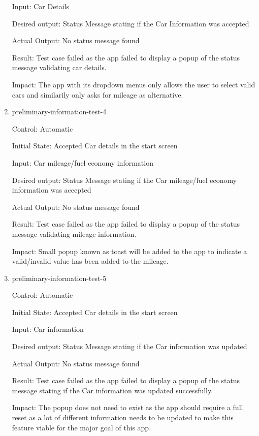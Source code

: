 \documentclass[12pt, titlepage]{article}
\begin{document}
\begin{enumerate}
Input: Car Details

Desired output: Status Message stating if the Car Information was accepted

Actual Output: No status message found

Result: Test case failed as the app failed to display a popup of the status message validating car details.

Impact: The app with its dropdown menus only allows the user to select valid cars and similarily only asks for 
mileage as alternative.

\item{preliminary-information-test-4\\}

Control: Automatic
					
Initial State: Accepted Car details in the start screen
					
Input: Car mileage/fuel economy information

Desired output: Status Message stating if the Car mileage/fuel economy information was accepted

Actual Output: No status message found

Result: Test case failed as the app failed to display a popup of the status message validating mileage information.

Impact: Small popup known as toast will be added to the app to indicate a valid/invalid value has been added to the mileage.

\item{preliminary-information-test-5\\}

Control: Automatic
					
Initial State: Accepted Car details in the start screen
					
Input: Car information

Desired output: Status Message stating if the Car information was updated

Actual Output: No status message found

Result: Test case failed as the app failed to display a popup of the status message stating if the Car information was updated successfully.

Impact: The popup does not need to exist as the app should require a full reset as a lot of different information needs to be 
updated to make this feature viable for the major goal of this app.

\end{enumerate}
\end{document}
